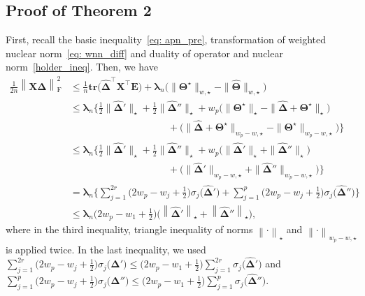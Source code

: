 \documentclass[alpha-refs]{wiley-article}
\begin{document}
\subsection{Proof of Theorem 2}
\label{pf_thm_3_2}
First, recall the basic inequality~\eqref{eq: apn_pre}, transformation of weighted nuclear norm~\eqref{eq: wnn_diff} and duality of operator and nuclear norm~\eqref{holder_ineq}.
Then, we have
\begin{align}
    \frac{1}{2n} \left\| \boldsymbol{X} \boldsymbol{\widehat{\Delta}} \right\|_{\text{F}}^{2}
    &\leq \frac{1}{n} \textbf{tr}\big( \boldsymbol{\widehat{\Delta}}^{\top} \boldsymbol{X}^{\top}\boldsymbol{E} \big) +
    \boldsymbol{\lambda}_{n} \big( \|\boldsymbol{\Theta^{\star}}\|_{w,\star} - \|\widehat{\boldsymbol{\Theta}}\|_{w,\star} \big) \nonumber \\
    &\leq \boldsymbol{\lambda}_{n}\bigg\{ \frac{1}{2}\|\boldsymbol{\widehat{\Delta}}'\|_{\star}
    + \frac{1}{2}\|\boldsymbol{\widehat{\Delta}}''\|_{\star}
    + w_{p}\big( \|\boldsymbol{\Theta^{\star}}\|_{\star} - \|\boldsymbol{\widehat{\Delta}}  + \boldsymbol{\Theta^{\star}}\|_{\star} \big) \nonumber \\
    &\qquad \qquad \qquad \qquad \qquad + \big( \|\boldsymbol{\widehat{\Delta}} + \boldsymbol{\Theta^{\star}}\|_{w_{p}-w,\star} - \|\boldsymbol{\Theta^{\star}}\|_{w_{p}-w,\star}\big)\bigg\} \nonumber \\
    &\leq \boldsymbol{\lambda}_{n}\bigg\{ \frac{1}{2}\|\boldsymbol{\widehat{\Delta}}'\|_{\star}
    + \frac{1}{2}\|\boldsymbol{\widehat{\Delta}}''\|_{\star}
    + w_{p}\big( \|\boldsymbol{\widehat{\Delta}}'\|_{\star} + \|\boldsymbol{\widehat{\Delta}}''\|_{\star} \big) \nonumber \\
    &\qquad \qquad \qquad \qquad \qquad + \big( \|\boldsymbol{\widehat{\Delta}}'\|_{w_{p}-w,\star} + \|\boldsymbol{\widehat{\Delta}}''\|_{w_{p}-w,\star}\big)\bigg\} \nonumber \\
    &=\boldsymbol{\lambda}_{n}\bigg\{ \sum_{j=1}^{2r}\bigg(2w_{p}-w_{j}+\frac{1}{2}\bigg)\sigma_{j}\big(\boldsymbol{\widehat{\Delta}}'\big) + \sum_{j=1}^{p}\bigg(2w_{p}-w_{j}+\frac{1}{2}\bigg)\sigma_{j}\big(\boldsymbol{\widehat{\Delta}}''\big)\bigg\} \nonumber \\
    &\leq \boldsymbol{\lambda}_{n} \bigg( 2w_{p}-w_{1}+\frac{1}{2} \bigg)
    \bigg( \left\|\boldsymbol{\widehat{\Delta}}'\right\|_{\star} + \left\|\boldsymbol{\widehat{\Delta}}'' \right\|_{\star} \bigg),  \label{eq: basic}
\end{align}
where in the third inequality, triangle inequality of norms $\left\| \cdot \right\|_{\star}$ and $\left\| \cdot \right\|_{w_{p}-w,\star}$ is applied twice.
In the last inequality, we used
$\sum_{j=1}^{2r}\big(2w_{p}-w_{j}+\frac{1}{2}\big)\sigma_{j}\big(\boldsymbol{\widehat{\Delta}}'\big)\leq \big(2w_{p}-w_{1}+\frac{1}{2}\big) \sum_{j=1}^{2r}\sigma_{j}\big(\boldsymbol{\widehat{\Delta}}'\big)$ and
$\sum_{j=1}^{p}\big(2w_{p}-w_{j}+\frac{1}{2}\big)\sigma_{j}\big(\boldsymbol{\widehat{\Delta}}''\big)\leq \big(2w_{p}-w_{1}+\frac{1}{2}\big) \sum_{j=1}^{p}\sigma_{j}\big(\boldsymbol{\widehat{\Delta}}''\big)$.
\end{document}
